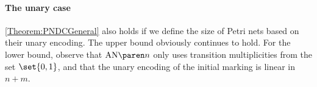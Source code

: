 \documentclass[../../diss.tex]{subfiles}
\begin{document}
\paragraph{The unary case}

\cref{Theorem:PNDCGeneral} also holds if we define the size of Petri nets based on their unary encoding.
The upper bound obviously continues to hold.
For the lower bound, observe that $\AckerNet{n}$ only uses transition multiplicities from the set $\set{0,1}$, and that the unary encoding of the initial marking is linear in $n + m$.
\end{document}
